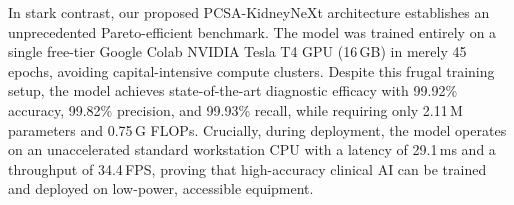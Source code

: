 \documentclass[]{elsarticle}
\begin{document}
In stark contrast, our proposed PCSA-KidneyNeXt architecture establishes an unprecedented Pareto-efficient benchmark. The model was trained entirely on a single free-tier Google Colab NVIDIA Tesla T4 GPU (16\,GB) in merely 45 epochs, avoiding capital-intensive compute clusters. Despite this frugal training setup, the model achieves state-of-the-art diagnostic efficacy with 99.92\% accuracy, 99.82\% precision, and 99.93\% recall, while requiring only 2.11\,M parameters and 0.75\,G FLOPs. Crucially, during deployment, the model operates on an unaccelerated standard workstation CPU with a latency of 29.1\,ms and a throughput of 34.4\,FPS, proving that high-accuracy clinical AI can be trained and deployed on low-power, accessible equipment.

\renewcommand{\arraystretch}{1.35}  
\setlength{\tabcolsep}{2.0pt}          
\scriptsize                        
\end{document}
